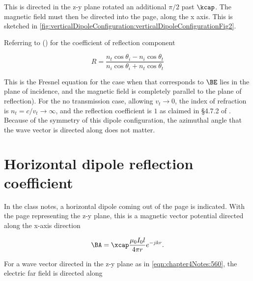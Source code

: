 This is directed in the z-y plane rotated an additional \( \pi/2 \) past \( \kcap \).  The magnetic field must then be directed into the page, along the x axis.  This is sketched in \cref{fig:verticalDipoleConfiguration:verticalDipoleConfigurationFig2}.


Referring to \citep{hecht1998hecht} () for the coefficient of reflection component

\begin{dmath}\label{eqn:chapter4Notes:620}
R
=
\frac{
n_t \cos\theta_i - n_i \cos\theta_t
}
{
n_i \cos\theta_i + n_t \cos\theta_t
}
\end{dmath}

This is the Fresnel equation for the case when
that corresponds to 
\( \BE \) lies in the plane of incidence, and the magnetic field is completely parallel to the plane of reflection).  For the no transmission case, allowing \( v_t \rightarrow 0 \), the index of refraction is \( n_t = c/v_t \rightarrow \infty \), and the reflection coefficient is \( 1 \) as claimed in \S 4.7.2 of \citep{balanis2005antenna}.  Because of the symmetry of this dipole configuration, the azimuthal angle that the wave vector is directed along does not matter.

\section{Horizontal dipole reflection coefficient}

In the class notes, a horizontal dipole coming out of the page is indicated.  With the page representing the z-y plane, this is a magnetic vector potential directed along the x-axis direction

\begin{equation}\label{eqn:chapter4Notes:640}
\BA = \xcap \frac{\mu_0 I_0 l}{4 \pi r} e^{-j k r}.
\end{equation}

For a wave vector directed in the z-y plane as in \cref{eqn:chapter4Notes:560}, the electric far field is directed along

